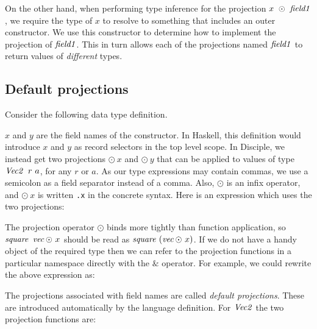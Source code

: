 On the other hand, when performing type inference for the projection $x \ \odot \ \operatorname{\mathit{field1}}$, we require the type of $x$ to resolve to something that includes an outer constructor. We use this constructor to determine how to implement the projection of $\operatorname{\mathit{field1}}$. This in turn allows each of the projections named $\operatorname{\mathit{field1}}$ to return values of \emph{different} types.

\subsection{Default projections}
\label{System:Projections:default}

Consider the following data type definition. 


$x$ and $y$ are the field names of the constructor. In Haskell, this definition would introduce $x$ and $y$ as record selectors in the top level scope. In Disciple, we instead get two projections $\odot \ x$ and $\odot \ y$ that can be applied to values of type $\operatorname{\mathit{Vec2}} \ r \ a$, for any $r$ or $a$. As our type expressions may contain commas, we use a semicolon as a field separator instead of a comma.  Also, $\odot$ is an infix operator, and $\odot \ x$ is written \texttt{.x} in the concrete syntax. Here is an expression which uses the two projections:


The projection operator $\odot$ binds more tightly than function application, so $\operatorname{\mathit{square}} \ \operatorname{\mathit{vec}} \odot \ x$ should be read as $\operatorname{\mathit{square}} \ (\operatorname{\mathit{vec}} \odot \ x)$. If we do not have a handy object of the required type then we can refer to the projection functions in a particular namespace directly with the $\&$ operator. For example, we could rewrite the above expression as:


The projections associated with field names are called \emph{default projections}. These are introduced automatically by the language definition. For $\operatorname{\mathit{Vec2}}$ the two projection functions are:

